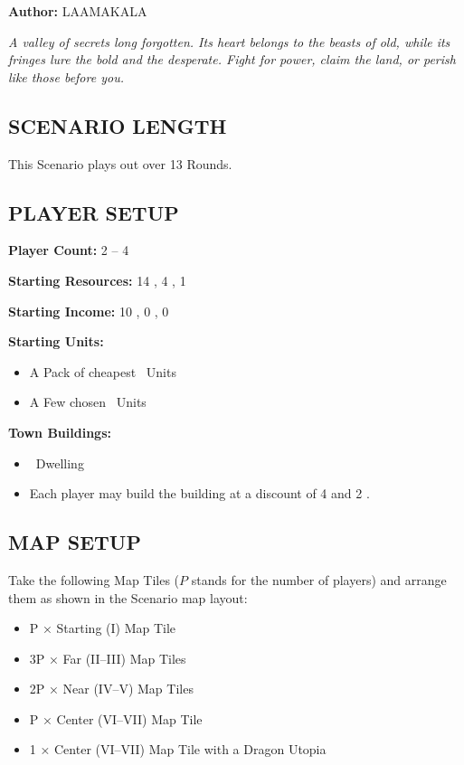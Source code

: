 
\begin{multicols*}{2}

\textbf{Author:} LAAMAKALA

\textit{A valley of secrets long forgotten. Its heart belongs to the beasts of old, while its fringes lure the bold and the desperate. Fight for power, claim the land, or perish like those before you.}

\subsection*{\MakeUppercase{Scenario Length}}
This Scenario plays out over 13 Rounds.

\subsection*{\MakeUppercase{Player Setup}}
\textbf{Player Count:} 2 -- 4

\textbf{Starting Resources:} 14 , 4 , 1 

\textbf{Starting Income:} 10 , 0 , 0 

\textbf{Starting Units:}

\begin{itemize}
  \item A Pack of cheapest \bronze\ Units
  \item A Few chosen \bronze\ Units
\end{itemize}

\textbf{Town Buildings:}
\begin{itemize}
  \item \bronze\ Dwelling
  \item Each player may build the  building at a discount of 4  and 2 .
\end{itemize}

\subsection*{\MakeUppercase{Map Setup}}
Take the following Map Tiles ($P$ stands for the number of players) and arrange them as shown in the Scenario map layout:

\begin{itemize}
  \item P × Starting (I) Map Tile
  \item 3P × Far (II–III) Map Tiles
  \item 2P × Near (IV–V) Map Tiles
  \item P × Center (VI–VII) Map Tile
  \item 1 × Center (VI–VII) Map Tile with a Dragon Utopia
\end{itemize}


\end{multicols*}
